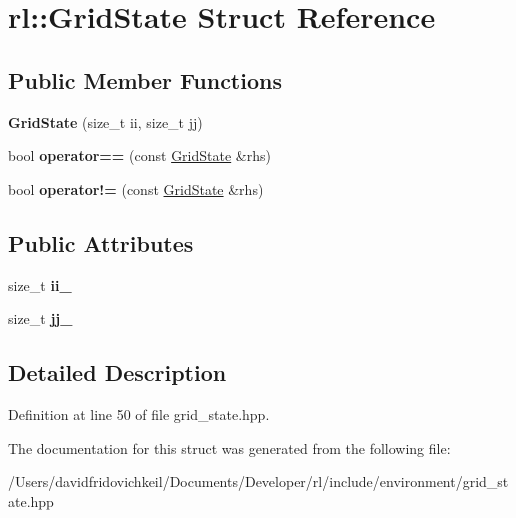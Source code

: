 \hypertarget{structrl_1_1_grid_state}{}\section{rl\+:\+:Grid\+State Struct Reference}
\label{structrl_1_1_grid_state}
\subsection*{Public Member Functions}
\begin{DoxyCompactItemize}
\item 
\hypertarget{structrl_1_1_grid_state_a7aee8d309c9081f8b9f28d09eed9cc8d}{}\label{structrl_1_1_grid_state_a7aee8d309c9081f8b9f28d09eed9cc8d} 
{\bfseries Grid\+State} (size\+\_\+t ii, size\+\_\+t jj)
\item 
\hypertarget{structrl_1_1_grid_state_af911883b99f50f7169c808e7b72b04c9}{}\label{structrl_1_1_grid_state_af911883b99f50f7169c808e7b72b04c9} 
bool {\bfseries operator==} (const \hyperlink{structrl_1_1_grid_state}{Grid\+State} \&rhs)
\item 
\hypertarget{structrl_1_1_grid_state_a3a68e2226d51a3b1a5aa763873bb9e47}{}\label{structrl_1_1_grid_state_a3a68e2226d51a3b1a5aa763873bb9e47} 
bool {\bfseries operator!=} (const \hyperlink{structrl_1_1_grid_state}{Grid\+State} \&rhs)
\end{DoxyCompactItemize}
\subsection*{Public Attributes}
\begin{DoxyCompactItemize}
\item 
\hypertarget{structrl_1_1_grid_state_a91bf4c50c85c2980c6213c72ec468691}{}\label{structrl_1_1_grid_state_a91bf4c50c85c2980c6213c72ec468691} 
size\+\_\+t {\bfseries ii\+\_\+}
\item 
\hypertarget{structrl_1_1_grid_state_aa53f8a955bb8507589d0c023c5e3f958}{}\label{structrl_1_1_grid_state_aa53f8a955bb8507589d0c023c5e3f958} 
size\+\_\+t {\bfseries jj\+\_\+}
\end{DoxyCompactItemize}


\subsection{Detailed Description}


Definition at line 50 of file grid\+\_\+state.\+hpp.



The documentation for this struct was generated from the following file\+:\begin{DoxyCompactItemize}
\item 
/\+Users/davidfridovichkeil/\+Documents/\+Developer/rl/include/environment/grid\+\_\+state.\+hpp\end{DoxyCompactItemize}
